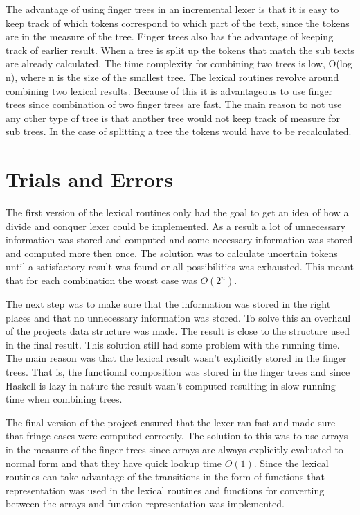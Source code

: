 The advantage of using finger trees in an incremental lexer is that it is easy
to keep track of which tokens correspond to which part of the text, since the
tokens are in the measure of the tree. Finger trees
also has the advantage of keeping track of earlier result. When a tree is split
up the tokens that match the sub texts are already calculated. The time
complexity for combining two trees is low, O(log n), where n is the size of the
smallest tree. The lexical routines revolve around combining two lexical
results. Because of this it is advantageous to use finger trees since combination
of two finger trees are fast. The main reason to not use any other type of tree
is that another tree would not keep track of measure for sub trees. In the case
of splitting a tree the tokens would have to be recalculated.

\section{Trials and Errors}
The first version of the lexical routines only had the goal to get an idea of
how a divide and conquer lexer could be implemented. As a result a lot of
unnecessary information was stored and computed and some necessary information
was stored and computed more then once. The solution was to calculate
uncertain tokens until a satisfactory result was found or all possibilities was
exhausted. This meant that for each combination the worst case was $O(2^n)$.

The next step was to make sure that the information was stored in the right
places and that no unnecessary information was stored. To solve this an overhaul
of the projects data structure was made. The result is close to the structure
used in the final result. This solution still had some problem with the running
time. The main reason was that the lexical result wasn't explicitly stored in
the finger trees. That is, the functional composition was stored in the finger
trees and since Haskell is lazy in nature the result wasn't computed resulting
in slow running time when combining trees.

The final version of the project ensured that the lexer ran fast and made
sure that fringe cases were computed correctly. The solution to this was to use
arrays in the measure of the finger trees since arrays are always explicitly
evaluated to normal form and that they have quick lookup time $O(1)$. Since the
lexical routines can take advantage of the transitions in the form of functions
that representation was used in the lexical routines and functions for
converting between the arrays and function representation was implemented.

